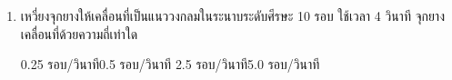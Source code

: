 \begin{enumerate}
	\item \runningj \nonet เหวี่ยงจุกยางให้เคลื่อนที่เป็นแนววงกลมในระนาบระดับศีรษะ  10  รอบ  ใช้เวลา  4  วินาที   จุกยางเคลื่อนที่ด้วยความถี่เท่าใด
	\begin{2c}
		{0.25  รอบ/วินาที}{0.5  รอบ/วินาที	}
		{2.5  รอบ/วินาที}{5.0  รอบ/วินาที}
	\end{2c}
\end{enumerate}

